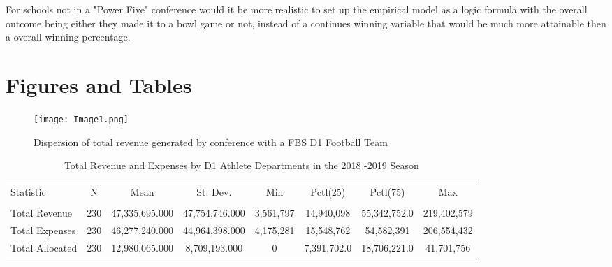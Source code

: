 \documentclass[12pt,english]{article}
\begin{document}
For schools not in a "Power Five" conference would it be more realistic to set up the empirical model as a logic formula with the overall outcome being either they made it to a bowl game or not, instead of a continues winning variable that would be much more attainable then a overall winning percentage. 

\vfill
\pagebreak{}
\begin{spacing}{1}


\end{spacing}

\vfill
\pagebreak{}
\clearpage

\section*{Figures and Tables}\label{sec:figTables}
\begin{figure}[ht]
\centering
\bigskip{}
\texttt{[image: Image1.png]}
\caption{Dispersion of total revenue generated by conference with a FBS D1 Football Team}
\label{fig:fig1}
\end{figure}
\begin{table}[!htbp] \centering 
\label{Table:Table1}
  \caption{Total Revenue and Expenses by D1 Athlete Departments in the 2018 -2019 Season} 
  \label{} 
\begin{tabular}{@{\extracolsep{5pt}}lccccccc} 
\\[-1.8ex]\hline 
\hline \\[-1.8ex] 
Statistic & \multicolumn{1}{c}{N} & \multicolumn{1}{c}{Mean} & \multicolumn{1}{c}{St. Dev.} & \multicolumn{1}{c}{Min} & \multicolumn{1}{c}{Pctl(25)} & \multicolumn{1}{c}{Pctl(75)} & \multicolumn{1}{c}{Max} \\ 
\hline \\[-1.8ex] 
Total Revenue & 230 & 47,335,695.000 & 47,754,746.000 & 3,561,797 & 14,940,098 & 55,342,752.0 & 219,402,579 \\ 
Total Expenses & 230 & 46,277,240.000 & 44,964,398.000 & 4,175,281 & 15,548,762 & 54,582,391 & 206,554,432 \\ 
Total Allocated & 230 & 12,980,065.000 & 8,709,193.000 & 0 & 7,391,702.0 & 18,706,221.0 & 41,701,756 \\ 
\hline \\[-1.8ex] 
\end{tabular} 
\end{table} 
\end{document}
